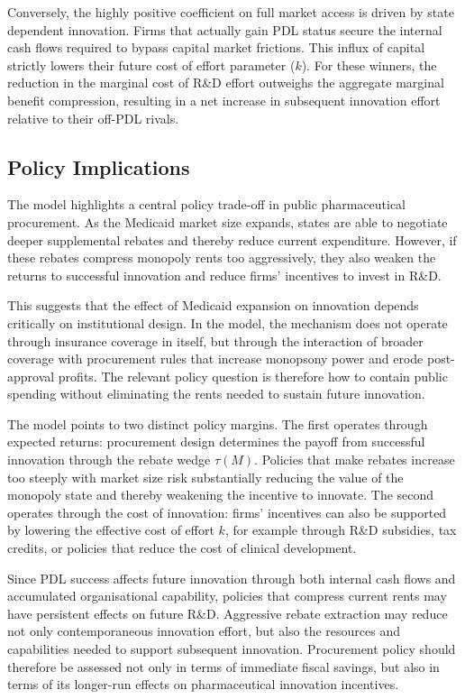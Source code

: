 \documentclass[12pt]{article}
\begin{document}
Conversely, the highly positive coefficient on full market access is driven by state dependent innovation. Firms that actually gain PDL status secure the internal cash flows required to bypass capital market frictions. This influx of capital strictly lowers their future cost of effort parameter ($k$). For these winners, the reduction in the marginal cost of R\&D effort outweighs the aggregate marginal benefit compression, resulting in a net increase in subsequent innovation effort relative to their off-PDL rivals.

\subsection{Policy Implications}
The model highlights a central policy trade-off in public pharmaceutical procurement. As the Medicaid market size expands, states are able to negotiate deeper supplemental rebates and thereby reduce current expenditure. However, if these rebates compress monopoly rents too aggressively, they also weaken the returns to successful innovation and reduce firms' incentives to invest in R\&D.

This suggests that the effect of Medicaid expansion on innovation depends critically on institutional design. In the model, the mechanism does not operate through insurance coverage in itself, but through the interaction of broader coverage with procurement rules that increase monopsony power and erode post-approval profits. The relevant policy question is therefore how to contain public spending without eliminating the rents needed to sustain future innovation.

The model points to two distinct policy margins. The first operates through expected returns: procurement design determines the payoff from successful innovation through the rebate wedge $\tau(M)$. Policies that make rebates increase too steeply with market size risk substantially reducing the value of the monopoly state and thereby weakening the incentive to innovate. The second operates through the cost of innovation: firms' incentives can also be supported by lowering the effective cost of effort $k$, for example through R\&D subsidies, tax credits, or policies that reduce the cost of clinical development.

Since PDL success affects future innovation through both internal cash flows and accumulated organisational capability, policies that compress current rents may have persistent effects on future R\&D. Aggressive rebate extraction may reduce not only contemporaneous innovation effort, but also the resources and capabilities needed to support subsequent innovation. Procurement policy should therefore be assessed not only in terms of immediate fiscal savings, but also in terms of its longer-run effects on pharmaceutical innovation incentives.
\end{document}
